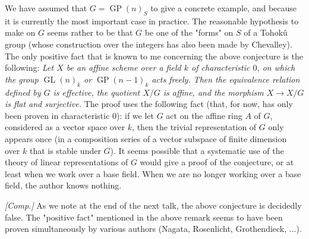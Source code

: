\begin{remark}\label{fga3.iii-8-remarks-8.2}
    We have assumed that $G=\operatorname{GP}(n)_S$ to give a concrete example, and because it is currently the most important case in practice.
    The reasonable hypothesis to make on $G$ seems rather to be that $G$ be one of the "forms" on $S$ of a Tohokû group (whose construction over the integers has also been made by Chevalley).
    The only positive fact that is known to me concerning the above conjecture is the following:
    \emph{Let $X$ be an affine scheme over a field $k$ of characteristic $0$, on which the group $\operatorname{GL}(n)_k$ or $\operatorname{GP}(n-1)_k$ acts freely. Then the equivalence relation defined by $G$ is effective, the quotient $X/G$ is affine, and the morphism $X\to X/G$ is flat and surjective.}
    The proof uses the following fact (that, for now, has only been proven in characteristic $0$):
    if we let $G$ act on the affine ring $A$ of $G$, considered as a vector space over $k$, then the trivial representation of $G$ only appears once (in a composition series of a vector subspace of finite dimension over $k$ that is stable under $G$).
    It seems possible that a systematic use of the theory of linear representations of $G$ would give a proof of the conjecture, or at least when we work over a base field.
    When we are no longer working over a base field, the author knows nothing.
\end{remark}

\begin{remark}\label{fga3.iii-8-remark-ii}
    \emph{[Comp.]}
    As we note at the end of the next talk, the above conjecture is decidedly false.
    The "positive fact" mentioned in the above remark seems to have been proven simultaneously by various authors (Nagata, Rosenlicht, Grothendieck, ...).
\end{remark}